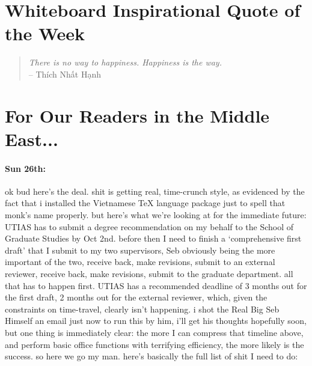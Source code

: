 \documentclass[12pt]{article}
\begin{document}
\newpage
\section*{Whiteboard Inspirational Quote of the Week}
\begin{quote}
\textit{There is no way to happiness. Happiness is the way.} \\-- \foreignlanguage{vietnam}{Thích Nhất Hạnh}

\end{quote} 

\section*{For Our Readers in the Middle East...}
\paragraph{Sun 26th:} ok bud here's the deal. shit is getting real, time-crunch style, as evidenced by the fact that i installed the Vietnamese TeX language package just to spell that monk's name properly. but here's what we're looking at for the immediate future: UTIAS has to submit a degree recommendation on my behalf to the School of Graduate Studies by Oct 2nd. before then I need to finish a `comprehensive first draft' that I submit to my two supervisors, Seb obviously being the more important of the two, receive back, make revisions, submit to an external reviewer, receive back, make revisions, submit to the graduate department. all that has to happen first. UTIAS has a recommended deadline of 3 months out for the first draft, 2 months out for the external reviewer, which, given the constraints on time-travel, clearly isn't happening. i shot the Real Big Seb Himself an email just now to run this by him, i'll get his thoughts hopefully soon, but one thing is immediately clear: the more I can compress that timeline above, and perform basic office functions with terrifying efficiency, the more likely is the success. so here we go my man. here's basically the full list of shit I need to do:
\end{document}
